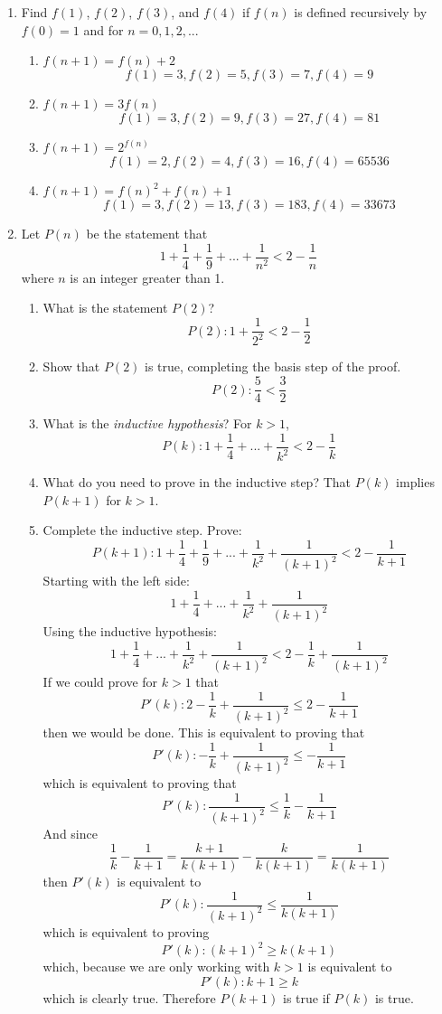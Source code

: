 \documentclass{article}
\begin{document}
\begin{enumerate}
\item Find $f(1)$, $f(2)$, $f(3)$, and $f(4)$ if $f(n)$ is defined recursively by $f(0) = 1$ and for $n = 0, 1, 2, ...$
  \begin{enumerate}
  \item $f(n + 1) = f(n) + 2$
    \[ f(1) = 3, f(2) = 5, f(3) = 7, f(4) = 9\]
  \item $f(n + 1) = 3f(n)$
    \[ f(1) = 3, f(2) = 9, f(3) = 27, f(4) = 81\]
  \item $f(n + 1) = 2^{f(n)}$
    \[ f(1) = 2, f(2) = 4, f(3) = 16, f(4) = 65536\]
  \item $f(n + 1) = f(n)^2 + f(n) + 1$
    \[ f(1) = 3, f(2) = 13, f(3) = 183, f(4) = 33673\]
  \end{enumerate}


\item Let $P(n)$ be the statement that
\[ 1 + \frac{1}{4} + \frac{1}{9} + ... + \frac{1}{n^2} < 2 - \frac{1}{n} \]
where $n$ is an integer greater than 1.
  \begin{enumerate}
  \item What is the statement $P(2)$?
\[ P(2): 1 + \frac{1}{2^2} < 2 - \frac{1}{2} \]

  \item Show that $P(2)$ is true, completing the basis step of the proof.
\[ P(2): \frac{5}{4} < \frac{3}{2} \]

  \item What is the \textit{inductive hypothesis}? For $k > 1$,
\[ P(k): 1 + \frac{1}{4} + ... + \frac{1}{k^2} < 2 - \frac{1}{k} \]

  \item What do you need to prove in the inductive step? That $P(k)$ implies $P(k+1)$ for $k > 1$.

  \item Complete the inductive step. Prove:
\[ P(k+1): 1 + \frac{1}{4} + \frac{1}{9} + ... + \frac{1}{k^2} + \frac{1}{(k + 1)^2} < 2 - \frac{1}{k + 1} \]
Starting with the left side:
\[ 1 + \frac{1}{4} + ... + \frac{1}{k^2} + \frac{1}{(k + 1)^2} \]
Using the inductive hypothesis:
\[ 1 + \frac{1}{4} + ... + \frac{1}{k^2} + \frac{1}{(k + 1)^2} < 2 - \frac{1}{k} + \frac{1}{(k + 1)^2} \]
If we could prove for $k > 1$ that
\[ P'(k): 2 - \frac{1}{k} + \frac{1}{(k + 1)^2} \leq 2 - \frac{1}{k + 1} \]
then we would be done. This is equivalent to proving that
\[ P'(k): - \frac{1}{k} + \frac{1}{(k + 1)^2} \leq - \frac{1}{k + 1} \]
which is equivalent to proving that
\[ P'(k): \frac{1}{(k + 1)^2} \leq \frac{1}{k} - \frac{1}{k + 1} \]
And since
\[ \frac{1}{k} - \frac{1}{k + 1} = \frac{k + 1}{k(k + 1)} - \frac{k}{k(k + 1)} = \frac{1}{k(k + 1)} \]
then $P'(k)$ is equivalent to
\[ P'(k): \frac{1}{(k + 1)^2} \leq \frac{1}{k(k + 1)} \]
which is equivalent to proving
\[ P'(k): (k + 1)^2 \geq k(k + 1) \]
which, because we are only working with $k > 1$ is equivalent to
\[ P'(k): k + 1 \geq k \]
which is clearly true. Therefore $P(k + 1)$ is true if $P(k)$ is true.


\end{enumerate}
\end{enumerate}
\end{document}
